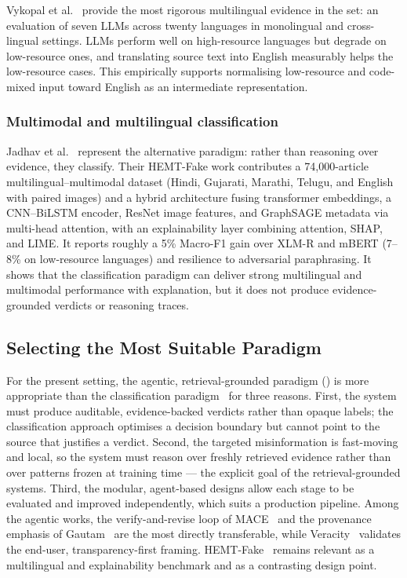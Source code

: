 \documentclass[12pt,a4paper]{article}
\begin{document}
Vykopal et al.~\cite{vykopal} provide the most rigorous multilingual evidence in
the set: an evaluation of seven LLMs across twenty languages in monolingual and
cross-lingual settings. LLMs perform well on high-resource languages but degrade
on low-resource ones, and translating source text into English measurably helps
the low-resource cases. This empirically supports normalising low-resource and
code-mixed input toward English as an intermediate representation.

\subsubsection{Multimodal and multilingual classification}
Jadhav et al.~\cite{hemtfake} represent the alternative paradigm: rather than
reasoning over evidence, they classify. Their HEMT-Fake work contributes a
74{,}000-article multilingual--multimodal dataset (Hindi, Gujarati, Marathi,
Telugu, and English with paired images) and a hybrid architecture fusing
transformer embeddings, a CNN--BiLSTM encoder, ResNet image features, and
GraphSAGE metadata via multi-head attention, with an explainability layer
combining attention, SHAP, and LIME. It reports roughly a 5\% Macro-F1 gain over
XLM-R and mBERT (7--8\% on low-resource languages) and resilience to adversarial
paraphrasing. It shows that the classification paradigm can deliver strong
multilingual and multimodal performance with explanation, but it does not produce
evidence-grounded verdicts or reasoning traces.

\subsection{Selecting the Most Suitable Paradigm}
For the present setting, the agentic, retrieval-grounded paradigm
(\cite{mace,gautam,ted,veracity,bangare}) is more appropriate than the
classification paradigm~\cite{hemtfake} for three reasons. First, the system must
produce auditable, evidence-backed verdicts rather than opaque labels; the
classification approach optimises a decision boundary but cannot point to the
source that justifies a verdict. Second, the targeted misinformation is
fast-moving and local, so the system must reason over freshly retrieved evidence
rather than over patterns frozen at training time --- the explicit goal of the
retrieval-grounded systems. Third, the modular, agent-based designs allow each
stage to be evaluated and improved independently, which suits a production
pipeline. Among the agentic works, the verify-and-revise loop of MACE~\cite{mace}
and the provenance emphasis of Gautam~\cite{gautam} are the most directly
transferable, while Veracity~\cite{veracity} validates the end-user,
transparency-first framing. HEMT-Fake~\cite{hemtfake} remains relevant as a
multilingual and explainability benchmark and as a contrasting design point.
\end{document}
